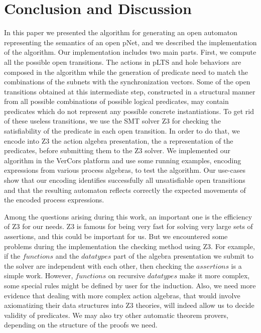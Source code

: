 \documentclass{lncs/llncs}
\newcommand{\QIN}[1]{\textcolor{airforceblue}{#1}}
\begin{document}


\section{Conclusion and Discussion}
\label{section:conclusion}

In this paper we presented the algorithm for generating an open
automaton representing the semantics of an open pNet, and we described
the implementation of the
algorithm. Our implementation includes two main parts. First, we
compute all the possible open transitions. The actions in pLTS and
hole behaviors are composed in the algorithm while the generation of
predicate need to match the combinations of the subnets with the
synchronization vectors. Some of the open transitions obtained at this
intermediate step, constructed in a structural manner from all
possible combinations of possible logical predicates, may
contain predicates which do not represent any possible concrete
instantiations. 
To get rid of these useless transitions, we use the SMT solver Z3 for checking the
satisfiability of the predicate in each open transition. In
order to do that, we encode into Z3 the action algebra presentation,
the a representation of the predicates, before submitting them to the
Z3 solver. We implemented our algorithm in the VerCors platform and use some
running examples, encoding expressions from various process algebras, to test the
algorithm. Our use-cases show that our encoding
identifies successfully all unsatisfiable open transitions and that
the resulting automaton reflects correctly the expected 
movements of the encoded process expressions.   

Among the questions arising during this work, an important one is the
efficiency of Z3 for our needs. Z3 is famous for being very fast for
solving very large sets of assertions, and this could be important for
us. But we encountered  some problems during the implementation the
checking method using Z3. For example, if the $functions$ and the
$datatypes$ part of the algebra presentation we submit to the solver
are independent with each other, then checking the $assertions$ is a
simple work. However, $functions$ on recursive $datatypes$ make it
more complex, some special rules might be defined by user for the
induction. Also, we need more evidence that dealing with more complex
action algebras, that would involve axiomatizing their data structures
into Z3 theories, will indeed allow us to decide validity of
predicates.
We may also try other automatic theorem provers, depending on the structure of the proofs we need.
\end{document}
